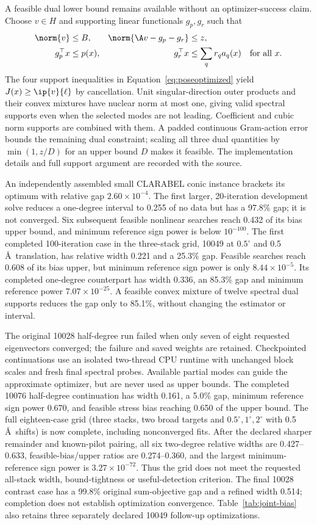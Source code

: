 A feasible dual lower bound remains available without an optimizer-success
claim. Choose $v\in H$ and supporting linear functionals $g_p,g_r$ such that
\begin{align*}
 \norm{v}&\le B,&\norm{\A v-g_p-g_r}&\le z,\\
 g_p^\top x&\le p(x),&
 g_r^\top x&\le\sum_qr_q a_q(x)\quad\text{for all }x.
\end{align*}
The four support inequalities in Equation~\eqref{eq:poseoptimized} yield
$J(x)\ge\ip{v}{\ell}$ by cancellation. Unit singular-direction outer products
and their convex mixtures have nuclear norm at most one, giving valid spectral
supports even when the selected modes are not leading. Coefficient and cubic
norm supports are combined with them. A padded continuous Gram-action error
bounds the remaining dual constraint; scaling all three dual quantities by
$\min(1,z/D)$ for an upper bound $D$ makes it feasible. The implementation
details and full support argument are recorded with the source.

An independently assembled small CLARABEL conic instance brackets its optimum
with relative gap $2.60\times10^{-4}$. The first larger, 20-iteration development
solve reduces a one-degree interval to 0.255 of no data but has a 97.8\% gap;
it is not converged. Six subsequent feasible nonlinear searches reach 0.432 of
its bias upper bound, and minimum reference sign power is below $10^{-100}$.
The first completed 100-iteration case in the three-stack grid, 10049 at
$0.5^\circ$ and 0.5\,\AA\ translation, has relative width 0.221 and a 25.3\%
gap. Feasible searches reach 0.608 of its bias upper, but minimum reference
sign power is only $8.44\times10^{-5}$. Its completed one-degree counterpart
has width 0.336, an 85.3\% gap and minimum reference power $7.07\times10^{-25}$.
A feasible convex mixture of twelve spectral dual supports reduces the gap
only to 85.1\%, without changing the estimator or interval.

The original 10028 half-degree run failed when only seven of eight requested
eigenvectors converged; the failure and saved weights are retained. Checkpointed
continuations use an isolated two-thread CPU runtime with unchanged block
scales and fresh final spectral probes. Available partial modes can guide the
approximate optimizer, but are never used as upper bounds. The completed
10076 half-degree continuation has width 0.161, a 5.0\% gap, minimum reference
sign power 0.670, and feasible stress bias reaching 0.650 of the upper bound.
The full eighteen-case grid (three stacks, two broad targets and
$0.5^\circ,1^\circ,2^\circ$ with 0.5\,\AA\ shifts) is now complete,
including nonconverged fits. After the declared sharper remainder and known-pilot
pairing, all six two-degree relative widths are 0.427--0.633, feasible-bias/upper
ratios are 0.274--0.360, and the largest minimum-reference sign power is
$3.27\times10^{-72}$. Thus the grid does not meet the requested all-stack
width, bound-tightness or useful-detection criterion. The final 10028 contrast
case has a 99.8\% original sum-objective gap and a refined width 0.514;
completion does not establish optimization convergence. Table~\ref{tab:joint-bias}
also retains three separately declared 10049 follow-up optimizations.

